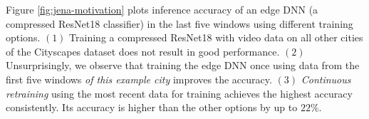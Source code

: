 \noindent{} Figure \ref{fig:jena-motivation} plots inference accuracy of an edge DNN (a compressed ResNet18 classifier) in the last five windows using different training options. 
$(1)$ Training a compressed ResNet18 with video data on all other cities of the Cityscapes dataset does not result in good performance.
$(2)$ Unsurprisingly, we observe that training the edge DNN once using data from the first five windows {\em of this example city} improves the accuracy. %
$(3)$ %
{\em Continuous retraining} using the most recent data for training achieves the highest accuracy consistently. Its accuracy is higher than the other options %
by up to $22\%$.%

